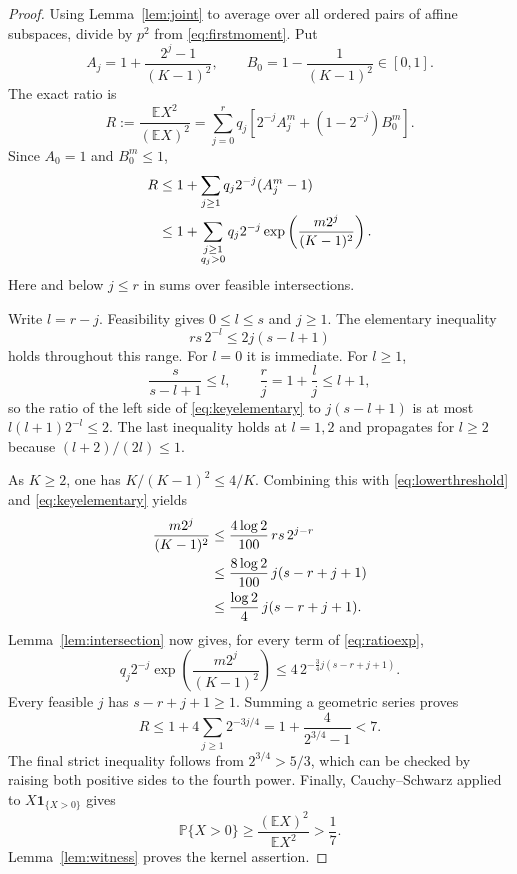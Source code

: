 \documentclass[11pt]{article}
\theoremstyle{remark}
\newcommand{\E}{\mathbb E}
\newcommand{\Prob}{\mathbb P}
\newcommand{\1}{\mathbf 1}
\begin{document}
\begin{proof}
Using Lemma~\ref{lem:joint} to average over all ordered pairs of affine
subspaces, divide by $p^2$ from \eqref{eq:firstmoment}. Put
\[
 A_j=1+\frac{2^j-1}{(K-1)^2},\qquad
 B_0=1-\frac1{(K-1)^2}\in[0,1].
\]
The exact ratio is
\begin{equation}\label{eq:exactratio}
 R:=\frac{\E X^2}{(\E X)^2}
 =\sum_{j=0}^r q_j\left[2^{-j}A_j^m+(1-2^{-j})B_0^m\right].
\end{equation}
Since $A_0=1$ and $B_0^m\leq1$,
\begin{align}
 R&\leq1+\sum_{j\geq1}q_j2^{-j}(A_j^m-1)\notag\\
 &\leq1+\sum_{\substack{j\geq1\\q_j>0}}
 q_j2^{-j}\exp\left(\frac{m2^j}{(K-1)^2}\right).
 \label{eq:ratioexp}
\end{align}
Here and below $j\leq r$ in sums over feasible intersections.

Write $l=r-j$. Feasibility gives $0\leq l\leq s$ and $j\geq1$.
The elementary inequality
\begin{equation}\label{eq:keyelementary}
 rs\,2^{-l}\leq2j(s-l+1)
\end{equation}
holds throughout this range. For $l=0$ it is immediate. For $l\geq1$,
\[
 \frac{s}{s-l+1}\leq l,\qquad \frac{r}{j}=1+\frac lj\leq l+1,
\]
so the ratio of the left side of \eqref{eq:keyelementary} to
$j(s-l+1)$ is at most $l(l+1)2^{-l}\leq2$. The last inequality holds
at $l=1,2$ and propagates for $l\geq2$ because
$(l+2)/(2l)\leq1$.

As $K\geq2$, one has $K/(K-1)^2\leq4/K$. Combining this with
\eqref{eq:lowerthreshold} and \eqref{eq:keyelementary} yields
\begin{align}
 \frac{m2^j}{(K-1)^2}
 &\leq\frac{4\log2}{100}\,rs\,2^{j-r}\notag\\
 &\leq\frac{8\log2}{100}\,j(s-r+j+1)\notag\\
 &\leq\frac{\log2}{4}\,j(s-r+j+1).\label{eq:exponent}
\end{align}
Lemma~\ref{lem:intersection} now gives, for every term of
\eqref{eq:ratioexp},
\[
 q_j2^{-j}\exp\left(\frac{m2^j}{(K-1)^2}\right)
 \leq4\,2^{-\frac34 j(s-r+j+1)}.
\]
Every feasible $j$ has $s-r+j+1\geq1$. Summing a geometric series proves
\[
 R\leq1+4\sum_{j\geq1}2^{-3j/4}
   =1+\frac4{2^{3/4}-1}<7.
\]
The final strict inequality follows from $2^{3/4}>5/3$, which can be
checked by raising both positive sides to the fourth power.
Finally, Cauchy--Schwarz applied to $X\1_{\{X>0\}}$ gives
\[
 \Prob\{X>0\}\geq\frac{(\E X)^2}{\E X^2}>\frac17.
\]
Lemma~\ref{lem:witness} proves the kernel assertion.
\end{proof}
\end{document}
